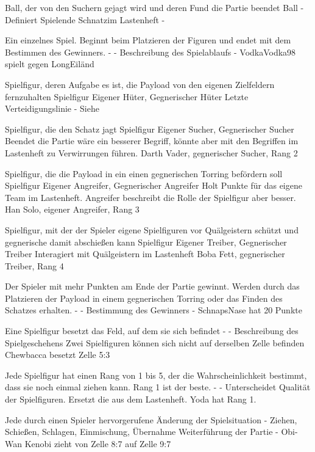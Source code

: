 {Ball, der von den Suchern gejagt wird und deren Fund die Partie beendet}
{Ball}
{-}
{Definiert Spielende}
{\glqq Schnatz\grqq im Lastenheft}
{-}

{Ein einzelnes Spiel. Beginnt beim Platzieren der Figuren und endet mit dem Bestimmen des Gewinners.}
{-}
{-}
{Beschreibung des Spielablaufs}
{-}
{VodkaVodka98 spielt gegen LongEiländ}

{Spielfigur, deren Aufgabe es ist, die Payload von den eigenen Zielfeldern fernzuhalten}
{Spielfigur}
{Eigener Hüter, Gegnerischer Hüter}
{Letzte Verteidigungslinie}
{-}
{Siehe \glqqSpielfigur\grqq}

{Spielfigur, die den Schatz jagt}
{Spielfigur}
{Eigener Sucher, Gegnerischer Sucher}
{Beendet die Partie}
{\grqq wäre ein besserer Begriff, könnte aber mit den Begriffen im Lastenheft zu Verwirrungen führen.}
{Darth Vader, gegnerischer Sucher, Rang 2}

{Spielfigur, die die Payload in ein einen gegnerischen Torring befördern soll}
{Spielfigur}
{Eigener Angreifer, Gegnerischer Angreifer}
{Holt Punkte für das eigene Team}
{\grqq im Lastenheft. Angreifer beschreibt die Rolle der Spielfigur aber besser.}
{Han Solo, eigener Angreifer, Rang 3}

{Spielfigur, mit der der Spieler eigene Spielfiguren vor Quälgeistern schützt und gegnerische damit abschießen kann}
{Spielfigur}
{Eigener Treiber, Gegnerischer Treiber}
{Interagiert mit Quälgeistern}
{\glqqTreiber\grqq im Lastenheft}
{Boba Fett, gegnerischer Treiber, Rang 4}

{Der Spieler mit mehr Punkten am Ende der Partie gewinnt. Werden durch das Platzieren der Payload in einem gegnerischen Torring oder das Finden des Schatzes erhalten.}
{-}
{-}
{Bestimmung des Gewinners}
{-}
{SchnapsNase hat 20 Punkte}

{Eine Spielfigur besetzt das Feld, auf dem sie sich befindet}
{-}
{-}
{Beschreibung des Spielgeschehens}
{Zwei Spielfiguren können sich nicht auf derselben Zelle befinden}
{Chewbacca besetzt Zelle 5:3}

{Jede Spielfigur hat einen Rang von 1 bis 5, der die Wahrscheinlichkeit bestimmt, dass sie noch einmal ziehen kann. Rang 1 ist der beste.}
{-}
{-}
{Unterscheidet Qualität der Spielfiguren.}
{Ersetzt die \glqqBesen\grqq aus dem Lastenheft.}
{Yoda hat Rang 1.}

{Jede durch einen Spieler hervorgerufene Änderung der Spielsituation}
{-}
{Ziehen, Schießen, Schlagen, Einmischung, Übernahme}
{Weiterführung der Partie}
{-}
{Obi-Wan Kenobi zieht von Zelle 8:7 auf Zelle 9:7}

